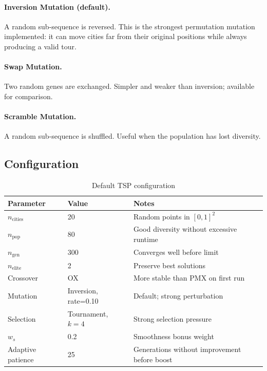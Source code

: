 \documentclass[12pt,a4paper]{article}
\begin{document}
\paragraph{Inversion Mutation (default).}
A random sub-sequence is reversed. This is the strongest permutation mutation implemented: it can move cities far from their original positions while always producing a valid tour.

\paragraph{Swap Mutation.}
Two random genes are exchanged. Simpler and weaker than inversion; available for comparison.

\paragraph{Scramble Mutation.}
A random sub-sequence is shuffled. Useful when the population has lost diversity.

\subsection{Configuration}

\begin{table}[H]
\centering
\caption{Default TSP configuration}
\label{tab:tsp_config}
\begin{tabular}{lll}
\toprule
\textbf{Parameter} & \textbf{Value} & \textbf{Notes} \\
\midrule
$n_\text{cities}$ & 20 & Random points in $[0,1]^2$ \\
$n_\text{pop}$ & 80 & Good diversity without excessive runtime \\
$n_\text{gen}$ & 300 & Converges well before limit \\
$n_\text{elite}$ & 2 & Preserve best solutions \\
Crossover & OX & More stable than PMX on first run \\
Mutation & Inversion, rate=0.10 & Default; strong perturbation \\
Selection & Tournament, $k=4$ & Strong selection pressure \\
$w_s$ & 0.2 & Smoothness bonus weight \\
Adaptive patience & 25 & Generations without improvement before boost \\
\bottomrule
\end{tabular}
\end{table}
\end{document}
